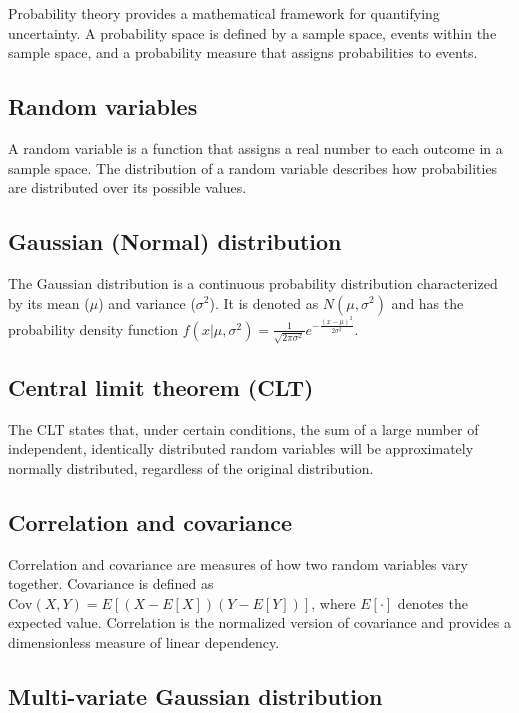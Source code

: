 \documentclass[11pt]{book} %
\begin{document}
Probability theory provides a mathematical framework for quantifying uncertainty. A probability space is defined by a sample space, events within the sample space, and a probability measure that assigns probabilities to events.

\subsection{Random variables}

A random variable is a function that assigns a real number to each outcome in a sample space. The distribution of a random variable describes how probabilities are distributed over its possible values.

\subsection{Gaussian (Normal) distribution}

The Gaussian distribution is a continuous probability distribution characterized by its mean (\(\mu\)) and variance (\(\sigma^2\)). It is denoted as \(N(\mu, \sigma^2)\) and has the probability density function \(f(x | \mu, \sigma^2) = \frac{1}{\sqrt{2\pi\sigma^2}} e^{-\frac{(x-\mu)^2}{2\sigma^2}}\).

\subsection{Central limit theorem (CLT)}

The CLT states that, under certain conditions, the sum of a large number of independent, identically distributed random variables will be approximately normally distributed, regardless of the original distribution.

\subsection{Correlation and covariance}

Correlation and covariance are measures of how two random variables vary together. Covariance is defined as \(\text{Cov}(X, Y) = E[(X - E[X])(Y - E[Y])]\), where \(E[\cdot]\) denotes the expected value. Correlation is the normalized version of covariance and provides a dimensionless measure of linear dependency.

\subsection{Multi-variate Gaussian distribution}
\end{document}
